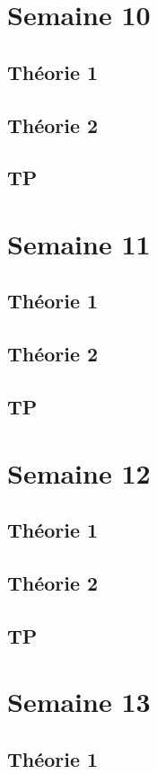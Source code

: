 \documentclass{article}
\begin{document}
\pagebreak
\section{Semaine 10}
\subsection{Théorie 1}
\subsection{Théorie 2}
\subsection{TP}

\pagebreak
\section{Semaine 11}
\subsection{Théorie 1}
\subsection{Théorie 2}
\subsection{TP}

\pagebreak
\section{Semaine 12}
\subsection{Théorie 1}
\subsection{Théorie 2}
\subsection{TP}

\pagebreak
\section{Semaine 13}
\subsection{Théorie 1}
\end{document}
